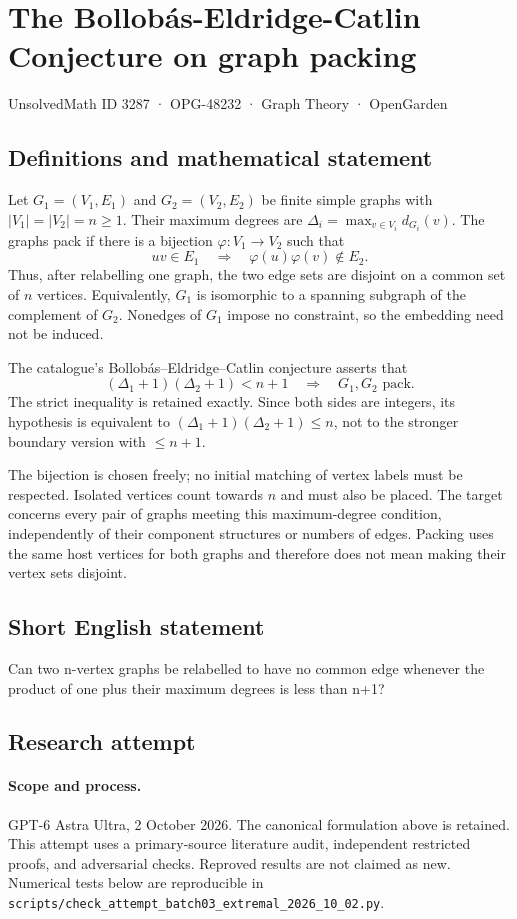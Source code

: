 \documentclass[11pt,a4paper]{article}
\begin{document}
\section*{The Bollobás-Eldridge-Catlin Conjecture on graph packing}\label{3287}
{\small UnsolvedMath ID 3287 · OPG-48232 · Graph Theory · OpenGarden}
\subsection{Definitions and mathematical statement}
Let $G_1=(V_1,E_1)$ and $G_2=(V_2,E_2)$ be finite simple graphs with
$|V_1|=|V_2|=n\ge1$. Their maximum degrees are
$\Delta_i=\max_{v\in V_i}d_{G_i}(v)$. The graphs pack if there is a
bijection $\varphi:V_1\to V_2$ such that
\[
                  uv\in E_1\quad\Longrightarrow\quad
                  \varphi(u)\varphi(v)\notin E_2.
\]
Thus, after relabelling one graph, the two edge sets are disjoint on
a common set of $n$ vertices. Equivalently, $G_1$ is isomorphic to a
spanning subgraph of the complement of $G_2$. Nonedges of $G_1$ impose
no constraint, so the embedding need not be induced.

The catalogue's Bollobás--Eldridge--Catlin conjecture asserts that
\[
                       (\Delta_1+1)(\Delta_2+1)<n+1
              \quad\Longrightarrow\quad G_1,G_2\text{ pack}.
\]
The strict inequality is retained exactly. Since both sides are
integers, its hypothesis is equivalent to
$(\Delta_1+1)(\Delta_2+1)\le n$, not to the stronger boundary version
with $\le n+1$.

The bijection is chosen freely; no initial matching of vertex labels
must be respected. Isolated vertices count towards $n$ and must also
be placed. The target concerns every pair of graphs meeting this
maximum-degree condition, independently of their component structures
or numbers of edges. Packing uses the same host vertices for both
graphs and therefore does not mean making their vertex sets disjoint.
\subsection{Short English statement}
Can two n-vertex graphs be relabelled to have no common edge whenever the product of one plus their maximum degrees is less than n+1?
\subsection{Research attempt}
\paragraph{Scope and process.}
GPT-6 Astra Ultra, 2 October 2026. The canonical formulation above is retained. This attempt uses a primary-source literature audit, independent restricted proofs, and adversarial checks. Reproved results are not claimed as new. Numerical tests below are reproducible in \texttt{scripts/check\_attempt\_batch03\_extremal\_2026\_10\_02.py}.
\end{document}
